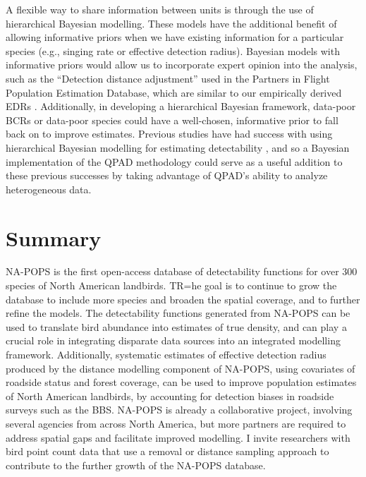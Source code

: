 \par A flexible way to share information between units is through the use of hierarchical Bayesian modelling. These models have the additional benefit of allowing informative priors when we have existing information for a particular species (e.g., singing rate or effective detection radius). Bayesian models with informative priors would allow us to incorporate expert opinion into the analysis, such as the “Detection distance adjustment” used in the Partners in Flight Population Estimation Database, which are similar to our empirically derived EDRs \citep{rosenberg_partners_2016, will_handbook_2020}. Additionally, in developing a hierarchical Bayesian framework, data-poor BCRs or data-poor species could have a well-chosen, informative prior to fall back on to improve estimates. Previous studies have had success with using hierarchical Bayesian modelling for estimating detectability \citep{amundson_hierarchical_2014, sollmann_hierarchical_2016}, and so a Bayesian implementation of the QPAD methodology could serve as a useful addition to these previous successes by taking advantage of QPAD’s ability to analyze heterogeneous data.

\section{Summary}

\par NA-POPS is the first open-access database of detectability functions for over 300 species of North American landbirds. TR=he goal is to continue to grow the database to include more species and broaden the spatial coverage, and to further refine the models. The detectability functions generated from NA-POPS can be used to translate bird abundance into estimates of true density, and can play a crucial role in integrating disparate data sources into an integrated modelling framework. Additionally, systematic estimates of effective detection radius produced by the distance modelling component of NA-POPS, using covariates of roadside status and forest coverage, can be used to improve population estimates of North American landbirds, by accounting for detection biases in roadside surveys such as the BBS. NA-POPS is already a collaborative project, involving several agencies from across North America, but more partners are required to address spatial gaps and facilitate improved modelling. I invite researchers with bird point count data that use a removal or distance sampling approach to contribute to the further growth of the NA-POPS database.